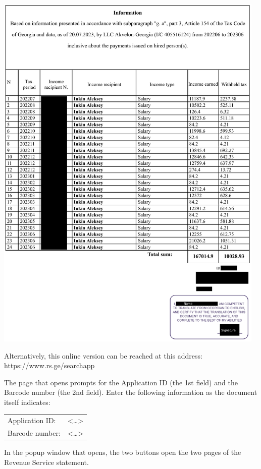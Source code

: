 \begin{center}
    \includegraphics[width=35em]{rs-2_en_public}
\end{center}



Alternatively, this online version can be reached at this address:
https://www.rs.ge/searchapp

The page that opens prompts for the Application ID (the 1st field)
and the Barcode number (the 2nd field).
Enter the following information as the document itself indicates:

\begin{tabular}{ll}
    Application ID: & <\dots> \\
    Barcode number: & <\dots> \\
\end{tabular}


In the popup window that opens, the two buttons open the two pages of the Revenue Service statement.

